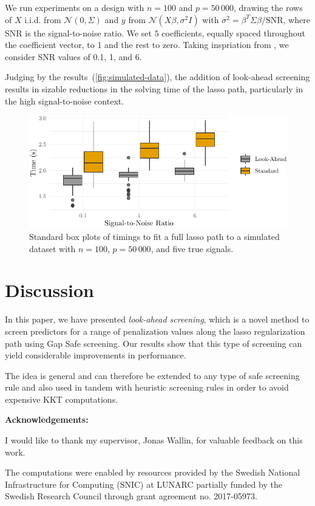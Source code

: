 \documentclass[b5paper,10pt,abstractoff,DIV=calc,headings=normal,twoside]{scrartcl}
\newcommand{\acknowledgements}{\par\mbox{}\par\noindent\textbf{Acknowledgements: }}
\theoremstyle{plain}
\theoremstyle{definition}
\theoremstyle{remark}
\begin{document}
We
run experiments on a design with \(n = 100\) and \(p = 50\,000\),
drawing the rows of \(X\) i.i.d.
from \(\mathcal{N}(0, \Sigma)\) and \(y\)
from \(\mathcal{N}(X\beta, \sigma^2I)\) with \(\sigma^2 =
\beta^T\Sigma\beta/\text{SNR}\), where SNR is the signal-to-noise ratio.  We set
\(5\) coefficients, equally spaced throughout the coefficient vector, to 1 and
the rest to zero. Taking inspriation from \citet{hastie2020}, we
consider SNR values of 0.1, 1, and 6.

Judging by the results~(\autoref{fig:simulated-data}), the addition of
look-ahead screening results in sizable reductions in the solving time of
the lasso path, particularly in the high signal-to-noise context.

\begin{figure}[hbtp]
  \centering
  \includegraphics{figures/simulateddata-timings.pdf}
  \caption{Standard box plots of timings to fit a full lasso path to
    a simulated dataset with \(n = 100\), \(p = 50\,000\), and five true
    signals.}
  \label{fig:simulated-data}
\end{figure}

\section{Discussion}\label{sec:discussion}

In this paper, we have presented \emph{look-ahead screening}, which is a
novel method to screen predictors for a range of penalization values along
the lasso regularization path using Gap Safe screening. Our results show that
this type of screening can yield considerable improvements in performance.

The idea is general and can therefore be extended to any type of safe screening
rule and also used in tandem with heuristic screening rules in order to avoid
expensive KKT computations.

\acknowledgements{
  I would like to thank my supervisor, Jonas Wallin, for valuable feedback
  on this work.

  The computations were enabled by resources provided by the Swedish
  National Infrastructure for Computing (SNIC) at LUNARC partially funded
  by the Swedish Research Council through grant agreement no. 2017-05973.
}


\end{document}

